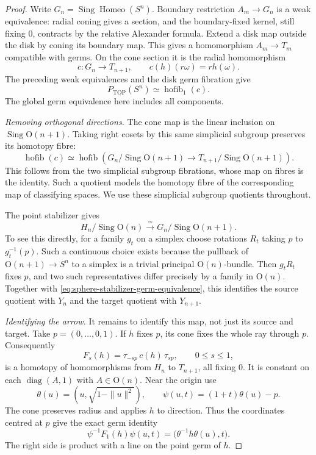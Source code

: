 \begin{proof}
Write $G_n=\operatorname{Sing}\operatorname{Homeo}(S^n)$.
Boundary restriction $A_m\to G_n$ is a weak equivalence: radial
coning gives a section, and the boundary-fixed kernel, still
fixing $0$, contracts by the relative Alexander formula.
Extend a disk map outside the disk by coning its boundary map.
This gives a homomorphism $A_m\to T_m$ compatible with germs.
On the cone section it is the radial homomorphism
\[
 c:G_n\longrightarrow T_{n+1},\qquad
                  c(h)(r\omega)=r h(\omega).
\]
The preceding weak equivalences and the disk germ fibration give
\begin{equation}\label{eq:top-sphere-cone-fibre}
             P_{\mathrm{TOP}}(S^n)\simeq\operatorname{hofib}_1(c).
\end{equation}
The global germ equivalence here includes all components.

\medskip\noindent\textit{Removing orthogonal directions.}
The cone map is the linear inclusion on
$\operatorname{Sing}\mathrm O(n+1)$.  Taking right cosets by
this same simplicial subgroup preserves its homotopy fibre:
\[
 \operatorname{hofib}(c)\simeq
 \operatorname{hofib}\left(
   G_n/\operatorname{Sing}\mathrm O(n+1)
       \longrightarrow T_{n+1}/\operatorname{Sing}\mathrm O(n+1)
                         \right).
\]
This follows from the two simplicial subgroup fibrations, whose
map on fibres is the identity.  Such a quotient models the
homotopy fibre of the corresponding map of classifying spaces.
We use these simplicial subgroup quotients throughout.

The point stabilizer gives
\[
 H_n/\operatorname{Sing}\mathrm O(n)
       \xrightarrow{\simeq}
 G_n/\operatorname{Sing}\mathrm O(n+1).
\]
To see this directly, for a family $g_t$ on a simplex choose
rotations $R_t$ taking $p$ to $g_t^{-1}(p)$.  Such a continuous
choice exists because the pullback of
$\mathrm O(n+1)\to S^n$ to a simplex is a trivial principal
$\mathrm O(n)$-bundle.  Then $g_tR_t$ fixes $p$, and two such
representatives differ precisely by a family in $\mathrm O(n)$.
Together with \eqref{eq:sphere-stabilizer-germ-equivalence},
this identifies the source quotient with $Y_n$ and the target
quotient with $Y_{n+1}$.

\medskip\noindent\textit{Identifying the arrow.}
It remains to identify this map, not just its source and target.
Take $p=(0,\ldots,0,1)$.  If $h$ fixes $p$, its cone fixes the
whole ray through $p$.  Consequently
\[
 F_s(h)=\tau_{-sp}\,c(h)\,\tau_{sp},\qquad 0\leq s\leq1,
\]
is a homotopy of homomorphisms from $H_n$ to $T_{n+1}$, all
fixing $0$.  It is constant on each
$\operatorname{diag}(A,1)$ with $A\in\mathrm O(n)$.
Near the origin use
\[
 \theta(u)=(u,\sqrt{1-\|u\|^2}),\qquad
 \psi(u,t)=(1+t)\theta(u)-p.
\]
The cone preserves radius and applies $h$ to direction.  Thus
the coordinates centred at $p$ give the exact germ identity
\begin{equation}\label{eq:cone-germ-line-stabilization}
 \psi^{-1}F_1(h)\psi(u,t)
               =\bigl(\theta^{-1}h\theta(u),t\bigr).
\end{equation}
The right side is product with a line on the point germ of $h$.


\end{proof}
